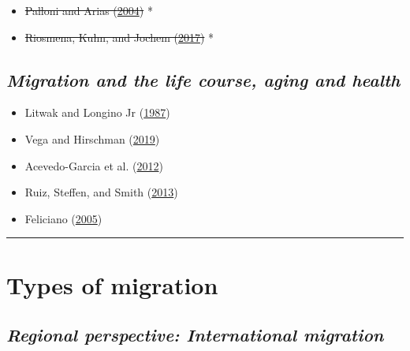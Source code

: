 \documentclass[
]{article}
\providecommand{\tightlist}{%
  \setlength{\itemsep}{0pt}\setlength{\parskip}{0pt}}
\begin{document}
\begin{itemize}
\tightlist
\item
  \sout{Palloni and Arias
  (\protect\hyperlink{ref-palloni2004paradox}{2004})} *
\item
  \sout{Riosmena, Kuhn, and Jochem
  (\protect\hyperlink{ref-riosmena2017explaining}{2017})} *
\end{itemize}

\hypertarget{migration-and-the-life-course-aging-and-health}{%
\subsection{\texorpdfstring{\emph{Migration and the life course, aging
and
health}}{Migration and the life course, aging and health}}\label{migration-and-the-life-course-aging-and-health}}

\begin{itemize}
\tightlist
\item
  Litwak and Longino Jr
  (\protect\hyperlink{ref-litwak1987migration}{1987})
\item
  Vega and Hirschman (\protect\hyperlink{ref-vega2019reasons}{2019})
\item
  Acevedo-Garcia et al.
  (\protect\hyperlink{ref-acevedo2012integrating}{2012})
\item
  Ruiz, Steffen, and Smith
  (\protect\hyperlink{ref-ruiz2013hispanic}{2013})
\item
  Feliciano (\protect\hyperlink{ref-feliciano2005educational}{2005})
\end{itemize}

\begin{center}\rule{0.5\linewidth}{0.5pt}\end{center}

\hypertarget{types-of-migration}{%
\section{\texorpdfstring{\textbf{Types of migration
}}{Types of migration }}\label{types-of-migration}}

\hypertarget{regional-perspective-international-migration}{%
\subsection{\texorpdfstring{\emph{Regional perspective: International
migration}}{Regional perspective: International migration}}\label{regional-perspective-international-migration}}
\end{document}
